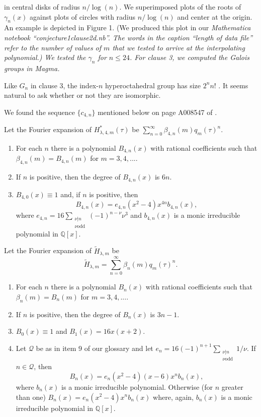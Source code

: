 \documentclass{article}
\begin{document}
in central disks of radius $n/\log (n)$. 
%
%
We superimposed plots of the roots
of $\gamma_n(x)$ against plots of circles with 
radius $n/\log (n)$
and center at the origin. An example is 
depicted in Figure 1.
(We produced this
plot in our \it Mathematica \rm notebook
``conjecture1clause2d.nb''.
The words in the caption
``length of data file'' refer to the number of
values of $m$ that we tested to arrive at the interpolating
polynomial.)
We tested the $\gamma_n$
for $n  \leq 24$.
For clause 3, we computed the Galois groups in \it Magma\rm.
\begin{remark}
Like $G_n$ in clause 3, 
the index-$n$ hyperoctahedral group
has size $2^n n!$
\cite{hyper,miller1918groups,graczyk2005hyper}.
It seems natural to ask
whether or not they are isomorphic.
\end{remark} 
\noindent
We found the sequence
$\{c_{4,n}\}$ mentioned below on page A008547 of \cite{OEIS}.
\begin{conjecture}
Let the Fourier expansion of 
$H^*_{\lambda,4,m}(\tau)$ be
$\sum_{n=0}^{\infty} \beta_{4,n}(m) q_m(\tau)^n$.
\begin{enumerate}
\item For each $n$ there is a polynomial
$B_{4,n}(x)$ with rational coefficients
such that 
$\beta_{4,n}(m)=B_{4,n}(m)$ for  $m = 3,4, ....$
\item If $n$ is positive, then the degree
of $B_{4,n}(x)$ is $6n$.
\item $B_{4,0}(x) \equiv 1$ and,
if $n$ is positive, then 
$$
B_{4,n}(x) = 
e_{4,n}  (x^2-4)x^{4n}  b_{4,n}(x),
$$
where $e_{4,n} = 
16 \sum_{\substack{\nu | n \\ \nu \text{odd}}} (-1)^{n-\nu} \nu^3$
and $b_{4,n}(x)$ is a monic irreducible polynomial
in $\mathbb{Q}[x]$.
\end{enumerate}
\end{conjecture}
\begin{conjecture}
Let the Fourier expansion of 
$\widetilde{H}_{\lambda,m}$ be
$$
\widetilde{H}_{\lambda,m} =
\sum_{n=0}^{\infty} \beta_n(m) q_m(\tau)^n.
$$
\begin{enumerate}
\item For each $n$ there is a polynomial
$B_n(x)$ with rational coefficients
such that 
$\beta_n(m)=B_n(m)$ for  $m = 3,4, ....$
\item If $n$ is positive, then the degree
of $B_n(x)$ is $3n - 1$.
\item $B_0(x) \equiv 1$ and $B_1(x)  = 16x(x+2)$.
\item Let  $\mathscr{Q}$ be as in item 9 of
our glossary and let 
$e_n =  16 (-1)^{n+1} 
\sum_{\substack{\nu | n \\ \nu \text{odd}}} 1/\nu$.
If $n \in \mathscr{Q}$, then 
$$
B_n(x) = 
e_n  (x^2-4)(x-6)x^n  b_n(x),
$$
where $b_n(x)$ is a monic irreducible polynomial.
Otherwise (for $n$ greater than one)
$B_n(x) =  e_n (x^2-4)x^n  b_n(x)$
where, again,
$b_n(x)$ is a monic irreducible 
polynomial in $\mathbb{Q}[x]$.
\end{enumerate}
\end{conjecture}
\end{document}
